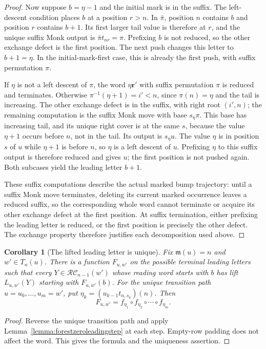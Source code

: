 \documentclass{amsart}
\newtheorem{corollary}[lemma]{Corollary}
\theoremstyle{definition}
\theoremstyle{remark}
\numberwithin{equation}{subsection}
\newcommand{\RC}{\mathcal{RC}}
\newcommand{\maxd}{\mathfrak{m}}
\begin{document}
\begin{proof}
Now suppose $b=\eta-1$ and the initial mark is in the suffix. The left-descent condition places $b$ at a position $r>n$. In $\bar\pi$, position $n$ contains $b$ and position $r$ contains $b+1$. Its first larger tail value is therefore at $r$, and the unique suffix Monk output is $\bar\pi t_{nr}=\pi$. Prefixing $b$ is not reduced, so the other exchange defect is the first position. The next push changes this letter to $b+1=\eta$. In the initial-mark-first case, this is already the first push, with suffix permutation $\pi$.

If $\eta$ is not a left descent of $\pi$, the word $\eta\mathbf r'$ with suffix permutation $\pi$ is reduced and terminates. Otherwise $\pi^{-1}(\eta+1)=i'<n$, since $\pi(n)=\eta$ and the tail is increasing. The other exchange defect is in the suffix, with right root $(i',n)$; the remaining computation is the suffix Monk move with base $s_\eta\pi$. This base has increasing tail, and its unique right cover is at the same $s$, because the value $\eta+1$ occurs before $n$, not in the tail. Its output is $s_\eta u$. The value $\eta$ is in position $s$ of $u$ while $\eta+1$ is before $n$, so $\eta$ is a left descent of $u$. Prefixing $\eta$ to this suffix output is therefore reduced and gives $u$; the first position is not pushed again. Both subcases yield the leading letter $b+1$.

These suffix computations describe the actual marked bump trajectory: until a suffix Monk move terminates, deleting its current marked occurrence leaves a reduced suffix, so the corresponding whole word cannot terminate or acquire its other exchange defect at the first position. At suffix termination, either prefixing the leading letter is reduced, or the first position is precisely the other defect. The exchange property therefore justifies each decomposition used above.
\end{proof}

\begin{corollary}[The lifted leading letter is unique]\label{corollary:forestzeroleadingunique}
Fix $\maxd(u)=n$ and $w'\in T_n(u)$. There is a function $F_{u,w'}$ on the possible terminal leading letters such that every $Y\in\RC_{n-1}(w')$ whose reading word starts with $b$ has lift $L_{u,w'}(Y)$ starting with $F_{u,w'}(b)$. For the unique transition path $u=u_0,\ldots,u_m=w'$, put $\eta_k=(u_{k-1}t_{n,s_k})(n)$. Then
$$F_{u,w'}=f_{\eta_1}\circ f_{\eta_2}\circ\cdots\circ f_{\eta_m}.$$
\end{corollary}
\begin{proof}
Reverse the unique transition path and apply Lemma~\ref{lemma:forestzeroleadingstep} at each step. Empty-row padding does not affect the word. This gives the formula and the uniqueness assertion.
\end{proof}
\end{document}

